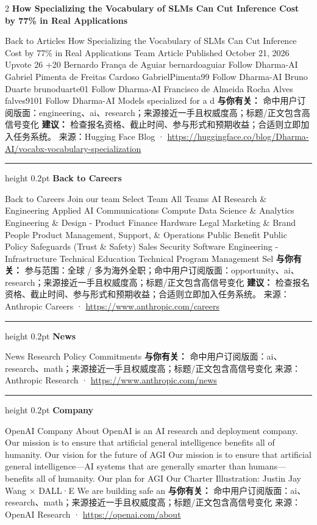 \documentclass[10.5pt]{ctexart}
\begin{document}
\begin{multicols}{2}
{\large\bfseries How Specializing the Vocabulary of SLMs Can Cut Inference Cost by 77\% in Real Applications}\par
Back to Articles How Specializing the Vocabulary of SLMs Can Cut Inference Cost by 77\% in Real Applications Team Article Published October 21, 2026 Upvote 26 +20 Bernardo França de Aguiar bernardoaguiar Follow Dharma-AI Gabriel Pimenta de Freitas Cardoso GabrielPimenta99 Follow Dharma-AI Bruno Duarte brunoduarte01 Follow Dharma-AI Francisco de Almeida Rocha Alves falves9101 Follow Dharma-AI Models specialized for a d
\textbf{与你有关：} 命中用户订阅版面：engineering、ai、research；来源接近一手且权威度高；标题/正文包含高信号变化
\textbf{建议：} 检查报名资格、截止时间、参与形式和预期收益；合适则立即加入任务系统。
{\footnotesize\color{ormuted} 来源：Hugging Face Blog · \url{https://huggingface.co/blog/Dharma-AI/vocabx-vocabulary-specialization}}
\vspace{2mm}
\hrule height 0.2pt
\vspace{2mm}
{\large\bfseries Back to Careers}\par
Back to Careers Join our team Select Team All Teams AI Research \& Engineering Applied AI Communications Compute Data Science \& Analytics Engineering \& Design - Product Finance Hardware Legal Marketing \& Brand People Product Management, Support, \& Operations Public Benefit Public Policy Safeguards (Trust \& Safety) Sales Security Software Engineering - Infrastructure Technical Education Technical Program Management Sel
\textbf{与你有关：} 参与范围：全球 / 多为海外全职；命中用户订阅版面：opportunity、ai、research；来源接近一手且权威度高；标题/正文包含高信号变化
\textbf{建议：} 检查报名资格、截止时间、参与形式和预期收益；合适则立即加入任务系统。
{\footnotesize\color{ormuted} 来源：Anthropic Careers · \url{https://www.anthropic.com/careers}}
\vspace{2mm}
\hrule height 0.2pt
\vspace{2mm}
{\large\bfseries News}\par
News Research Policy Commitments
\textbf{与你有关：} 命中用户订阅版面：ai、research、math；来源接近一手且权威度高；标题/正文包含高信号变化
{\footnotesize\color{ormuted} 来源：Anthropic Research · \url{https://www.anthropic.com/news}}
\vspace{2mm}
\hrule height 0.2pt
\vspace{2mm}
{\large\bfseries Company}\par
OpenAI Company About OpenAI is an AI research and deployment company. Our mission is to ensure that artificial general intelligence benefits all of humanity. Our vision for the future of AGI Our mission is to ensure that artificial general intelligence—AI systems that are generally smarter than humans—benefits all of humanity. Our plan for AGI Our Charter Illustration: Justin Jay Wang × DALL·E We are building safe an
\textbf{与你有关：} 命中用户订阅版面：ai、research、math；来源接近一手且权威度高；标题/正文包含高信号变化
{\footnotesize\color{ormuted} 来源：OpenAI Research · \url{https://openai.com/about}}
\end{multicols}
\end{document}
